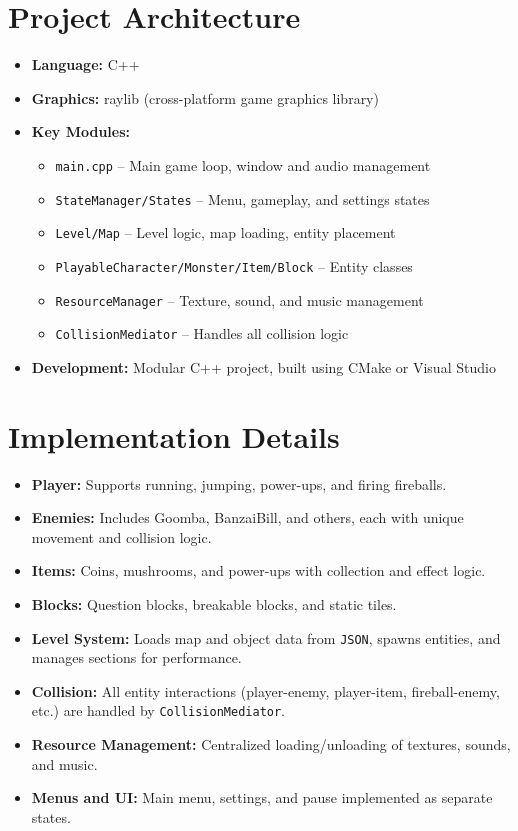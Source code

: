 \begin{flushleft}
\begin{flushleft}
\section{Project Architecture}
\begin{itemize}
    \item \textbf{Language:} C++
    \item \textbf{Graphics:} raylib (cross-platform game graphics library)
    \item \textbf{Key Modules:}
    \begin{itemize}
        \item \textcolor{blue!70!black}{\texttt{main.cpp}} – Main game loop, window and audio management
        \item \textcolor{teal!80!black}{\texttt{StateManager/States}} – Menu, gameplay, and settings states
        \item \textcolor{orange!80!black}{\texttt{Level/Map}} – Level logic, map loading, entity placement
        \item \textcolor{violet!80!black}{\texttt{PlayableCharacter/Monster/Item/Block}} – Entity classes
        \item \textcolor{red!70!black}{\texttt{ResourceManager}} – Texture, sound, and music management
        \item \textcolor{green!60!black}{\texttt{CollisionMediator}} – Handles all collision logic
    \end{itemize}
    \item \textbf{Development:} Modular C++ project, built using CMake or Visual Studio
\end{itemize}

\section{Implementation Details}
\begin{itemize}
    \item \textbf{Player:} Supports running, jumping, power-ups, and firing fireballs.
    \item \textbf{Enemies:} Includes Goomba, BanzaiBill, and others, each with unique movement and collision logic.
    \item \textbf{Items:} Coins, mushrooms, and power-ups with collection and effect logic.
    \item \textbf{Blocks:} Question blocks, breakable blocks, and static tiles.
    \item \textbf{Level System:} Loads map and object data from \textcolor{orange!80!black}{\texttt{JSON}}, spawns entities, and manages sections for performance.
    \item \textbf{Collision:} All entity interactions (player-enemy, player-item, fireball-enemy, etc.) are handled by \textcolor{green!60!black}{\texttt{CollisionMediator}}.
    \item \textbf{Resource Management:} Centralized loading/unloading of textures, sounds, and music.
    \item \textbf{Menus and UI:} Main menu, settings, and pause implemented as separate states.
\end{itemize}


\end{flushleft}
\end{flushleft}
